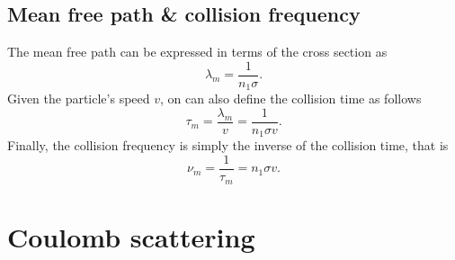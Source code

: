 \documentclass[a4paper,11pt]{report}
\begin{document}
\section{Mean free path \& collision frequency}
The mean free path can be expressed in terms of the cross section as
\begin{equation}
    \lambda_m = \frac{1}{n_1 \sigma}.
\end{equation}
Given the particle's speed $v$, on can also define the collision time as follows
\begin{equation}
    \tau_m = \frac{\lambda_m}{v} = \frac{1}{n_1 \sigma v}.
\end{equation}
Finally, the collision frequency is simply the inverse of the collision time, that is
\begin{equation}
    \nu_{m} = \frac{1}{\tau_m} = n_1 \sigma v.
\end{equation}

\chapter{Coulomb scattering}

\end{document}
